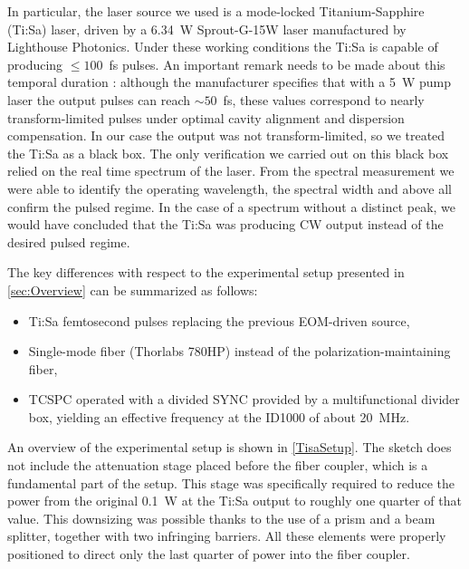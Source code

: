 In particular, the laser source we used is a mode-locked Titanium-Sapphire (Ti:Sa) laser, driven by a 6.34~W Sprout-G-15W laser manufactured by Lighthouse Photonics. Under these working conditions the Ti:Sa is capable of producing $\leq 100$~fs pulses. An important remark needs to be made about this temporal duration : although the manufacturer specifies that with a 5~W pump laser the output pulses can reach $\sim 50$~fs, these values correspond to nearly transform-limited pulses under optimal cavity alignment and dispersion compensation. In our case the output was not transform-limited, so we treated the Ti:Sa as a black box. The only verification we carried out on this black box relied on the real time spectrum of the laser. From the spectral measurement we were able to identify the operating wavelength, the spectral width and above all confirm the pulsed regime. In the case of a spectrum without a distinct peak, we would have concluded that the Ti:Sa was producing CW output instead of the desired pulsed regime.

The key differences with respect to the experimental setup presented in \autoref{sec:Overview} can be summarized as follows:
\begin{itemize}
    \item Ti:Sa femtosecond pulses replacing the previous EOM-driven source,
    \item Single-mode fiber (Thorlabs 780HP) instead of the polarization-maintaining fiber,
    \item TCSPC operated with a divided SYNC provided by a multifunctional divider box, yielding an effective frequency at the ID1000 of about 20~MHz.
\end{itemize}

An overview of the experimental setup is shown in \autoref{TisaSetup}. The sketch does not include the attenuation stage placed before the fiber coupler, which is a fundamental part of the setup. This stage was specifically required to reduce the power from the original 0.1~W at the Ti:Sa output to roughly one quarter of that value. This downsizing was possible thanks to the use of a prism and a beam splitter, together with two infringing barriers. All these elements were properly positioned to direct only the last quarter of power into the fiber coupler.


